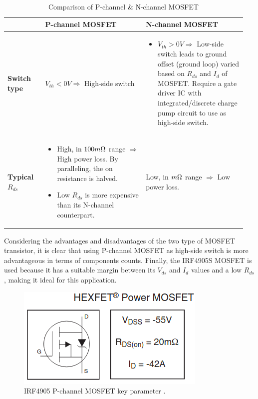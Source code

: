 \documentclass[main.tex]{subfiles}
\begin{document}
    \begin{table}[!h]
        \centering
        \begin{tabular}{|m{0.15\linewidth}|m{0.4\linewidth}|m{0.4\linewidth}|}
        
        \hline
        & \textbf{P-channel MOSFET} &  \textbf{N-channel MOSFET} \\
        \hline
        \textbf{Switch type} & $V_{th} < 0V \Rightarrow$ High-side switch & 
        \begin{itemize}
            \item $V_{th} > 0V \Rightarrow $ Low-side switch leads to ground offset (ground loop) varied based on $R_{ds}$ and $I_{d}$ of MOSFET. Require a gate driver IC with integrated/discrete charge pump circuit to use as high-side switch.
        \end{itemize}
        \\
        \hline
        \textbf{Typical $R_{ds}$} & 
        \begin{itemize}
            \item High, in $100 m\ohm$ range $\Rightarrow$ High power loss. By paralleling, the on resistance is halved.
            \item Low $R_{ds}$ is more expensive than its N-channel counterpart.
        \end{itemize}
         
        & Low, in $m\ohm$ range $\Rightarrow$ Low power loss.
        \\
        
        \hline
        \end{tabular}
        \caption{Comparison of P-channel \& N-channel MOSFET}
        \label{table:MOSFET_channel_type}

    \end{table}    

    \justify
    Considering the advantages and disadvantages of the two type of MOSFET transistor, it is clear that using P-channel MOSFET as high-side switch is more advantageous in terms of components counts. Finally, the IRF4905S MOSFET is used because it has a suitable margin between its $V_{ds}$ and $I_{d}$ values and a low $R_{ds}$, making it ideal for this application. 

    \begin{figure}[!h]
        \centerline{\includegraphics[scale=0.5]{media/IRF4905_key_parameters.png}}
        \caption{IRF4905 P-channel MOSFET key parameter \cite{IRF4905S}.}
        \label{fig:IRF4905S_param}
    \end{figure}    
    
\end{document}

